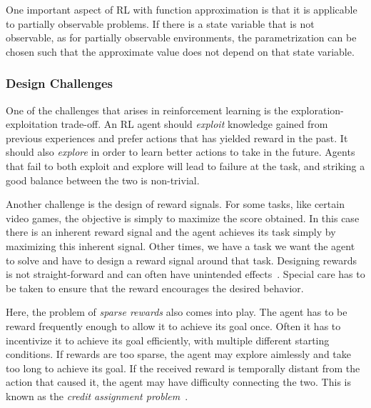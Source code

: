 One important aspect of RL with function approximation is that it is applicable to partially observable problems.
If there is a state variable that is not observable, as for partially observable environments,
the parametrization can be chosen such that the approximate value does not depend on that state variable.~\cite{sutton_reinforcement_2018}


\subsubsection{Design Challenges}


One of the challenges that arises in reinforcement learning is the exploration-exploitation trade-off.
An RL agent should \textit{exploit} knowledge gained from previous experiences and prefer actions that has yielded reward in the past.
It should also \textit{explore} in order to learn better actions to take in the future.
Agents that fail to both exploit and explore will lead to failure at the task, and striking a good balance between the two is non-trivial.~\cite{sutton_reinforcement_2018}

Another challenge is the design of reward signals.
For some tasks, like certain video games, the objective is simply to maximize the score obtained.
In this case there is an inherent reward signal and the agent achieves its task simply by maximizing this inherent signal.
Other times, we have a task we want the agent to solve and have to design a reward signal around that task.
Designing rewards is not straight-forward and can often have unintended effects~\cite{sutton_reinforcement_2018}.
Special care has to be taken to ensure that the reward encourages the desired behavior.

Here, the problem of \textit{sparse rewards} also comes into play.
The agent has to be reward frequently enough to allow it to achieve its goal once.
Often it has to incentivize it to achieve its goal efficiently, with multiple different starting conditions.
If rewards are too sparse, the agent may explore aimlessly and take too long to achieve its goal.
If the received reward is temporally distant from the action that caused it, the agent may have difficulty connecting the two.
This is known as the \textit{credit assignment problem}~\cite{minsky_steps_1961}.

